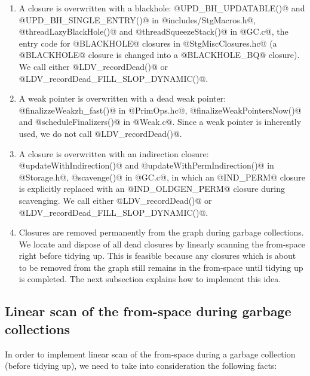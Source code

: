 \documentclass{article}
\begin{document}
\begin{enumerate}
\item A closure is overwritten with a blackhole: 
  @UPD_BH_UPDATABLE()@ and @UPD_BH_SINGLE_ENTRY()@ in @includes/StgMacros.h@,
  @threadLazyBlackHole()@ and @threadSqueezeStack()@ in @GC.c@,
  the entry code for @BLACKHOLE@ closures in @StgMiscClosures.hc@ (a 
  @BLACKHOLE@ closure is changed into a @BLACKHOLE_BQ@ closure).
  We call either @LDV_recordDead()@ or @LDV_recordDead_FILL_SLOP_DYNAMIC()@.

\item A weak pointer is overwritten with a dead weak pointer:
  @finalizzeWeakzh_fast()@ in @PrimOps.hc@, 
  @finalizeWeakPointersNow()@ and @scheduleFinalizers()@ in @Weak.c@.
  Since a weak pointer is inherently used, we do not call @LDV_recordDead()@.

\item A closure is overwritten with an indirection closure:
  @updateWithIndirection()@ and @updateWithPermIndirection()@ in @Storage.h@,
  @scavenge()@ in @GC.c@, in which an @IND_PERM@ closure is explicitly replaced
  with an @IND_OLDGEN_PERM@ closure during scavenging.
  We call either @LDV_recordDead()@ or @LDV_recordDead_FILL_SLOP_DYNAMIC()@.
  
\item Closures are removed permanently from the graph during garbage
collections.  We locate and dispose of all dead closures by linearly
scanning the from-space right before tidying up.  This is feasible
because any closures which is about to be removed from the graph still
remains in the from-space until tidying up is completed.  The next
subsection explains how to implement this idea.
\end{enumerate}

\subsection{Linear scan of the from-space during garbage collections}

In order to implement linear scan of the from-space during a garbage collection 
(before tidying up),
we need to take into consideration the following facts:
\end{document}
